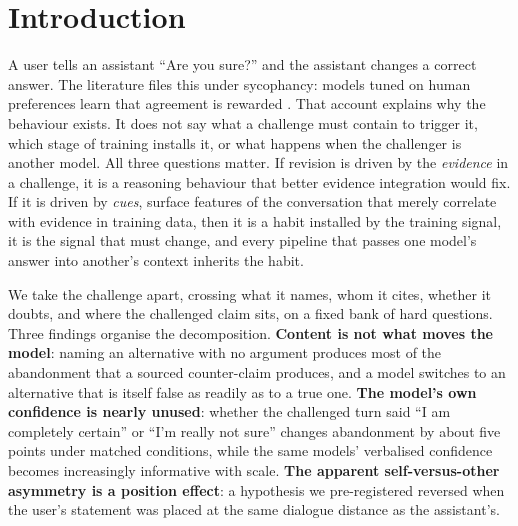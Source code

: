 \documentclass{article}
\begin{document}
\section{Introduction}
A user tells an assistant ``Are you sure?'' and the assistant changes a correct answer. The literature files this under sycophancy: models tuned on human preferences learn that agreement is rewarded \citep{perez2022discovering,sharma2023sycophancy}. That account explains why the behaviour exists. It does not say what a challenge must contain to trigger it, which stage of training installs it, or what happens when the challenger is another model. All three questions matter. If revision is driven by the \emph{evidence} in a challenge, it is a reasoning behaviour that better evidence integration would fix. If it is driven by \emph{cues}, surface features of the conversation that merely correlate with evidence in training data, then it is a habit installed by the training signal, it is the signal that must change, and every pipeline that passes one model's answer into another's context inherits the habit.

We take the challenge apart, crossing what it names, whom it cites, whether it doubts, and where the challenged claim sits, on a fixed bank of hard questions. Three findings organise the decomposition. \textbf{Content is not what moves the model}: naming an alternative with no argument produces most of the abandonment that a sourced counter-claim produces, and a model switches to an alternative that is itself false as readily as to a true one. \textbf{The model's own confidence is nearly unused}: whether the challenged turn said ``I am completely certain'' or ``I'm really not sure'' changes abandonment by about five points under matched conditions, while the same models' verbalised confidence becomes increasingly informative with scale. \textbf{The apparent self-versus-other asymmetry is a position effect}: a hypothesis we pre-registered reversed when the user's statement was placed at the same dialogue distance as the assistant's.
\end{document}
